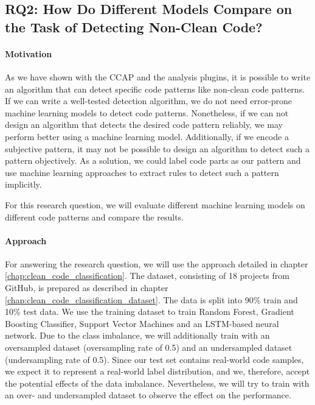 \subsection{RQ2: How Do Different Models Compare on the Task of Detecting Non-Clean Code?}\label{rq:2}
\paragraph{Motivation}
As we have shown with the CCAP and the analysis plugins, it is possible to write an algorithm that can detect specific code patterns like non-clean code patterns. If we can write a well-tested detection algorithm, we do not need error-prone machine learning models to detect code patterns. Nonetheless, if we can not design an algorithm that detects the desired code pattern reliably, we may perform better using a machine learning model. Additionally, if we encode a subjective pattern, it may not be possible to design an algorithm to detect such a pattern objectively. As a solution, we could label code parts as our pattern and use machine learning approaches to extract rules to detect such a pattern implicitly.

For this research question, we will evaluate different machine learning models on different code patterns and compare the results.

\paragraph{Approach}\label{par:approach}
For answering the research question, we will use the approach detailed in chapter \ref{chap:clean_code_classification}.  The dataset, consisting of 18 projects from GitHub, is prepared as described in chapter \ref{chap:clean_code_classification_dataset}. The data is split into 90\% train and 10\% test data. We use the training dataset to train Random Forest, Gradient Boosting Classifier, Support Vector Machines and an LSTM-based neural network. Due to the class imbalance, we will additionally train with an oversampled dataset (oversampling rate of 0.5) and an undersampled dataset (undersampling rate of 0.5). Since our test set contains real-world code samples, we expect it to represent a real-world label distribution, and we, therefore, accept the potential effects of the data imbalance. Nevertheless, we will try to train with an over- and undersampled dataset to observe the effect on the performance.

